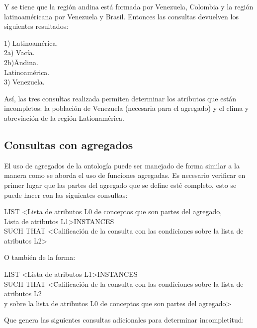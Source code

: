 Y se tiene que la región andina está formada por Venezuela, Colombia y la región latinoaméricana por Venezuela y Brasil. Entonces las consultas devuelven los siguientes resultados: 

\begin{tabbing}	
1) Latinoamérica. \\
2a) Vacía. \\
2b)\= Andina.\\
\> Latinoamérica.\\
3) Venezuela. \\
\end{tabbing}

Así, las tres consultas realizada permiten determinar los atributos que están incompletos: la población de Venezuela (necesaria para el agregado) y el clima y abreviación de la región Lationamérica. \\

\subsection{Consultas con agregados}

El uso de agregados de la ontología puede ser manejado de forma similar a la manera como se aborda el uso de funciones agregadas. Es necesario verificar en primer lugar que las partes del agregado que se define esté completo, esto se puede hacer con las siguientes consultas: 

\begin{tabbing}
LIST \textless \= Lista de atributos L0 de conceptos que son partes del agregado, \\
\> Lista de atributos L1\textgreater INSTANCES \\
SUCH THAT \textless Calificación de la consulta con las condiciones sobre la lista de atributos L2\textgreater 
\end{tabbing}

O también de la forma:

\begin{tabbing}
LIST \textless Lista de atributos L1\textgreater INSTANCES \\
SUCH THAT \textless \= Calificación de la consulta con las condiciones sobre la lista de atributos L2\\
\> y sobre la lista de atributos L0 de conceptos que son partes del agregado\textgreater 
\end{tabbing}

Que genera las siguientes consultas adicionales para determinar incompletitud: \\

